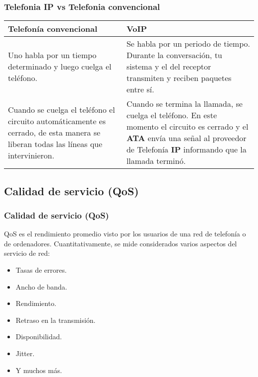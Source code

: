 \documentclass{beamer}
\begin{document}
\begin{frame}
\frametitle{Telefonia IP vs Telefonia convencional}
\begin{tabular}{|p{5.5cm}|p{5.5cm}|}
				\hline
		Telefonía convencional & VoIP \\
		\hline \hline
		Uno habla por un tiempo determinado y luego cuelga el teléfono. & Se habla por un periodo de tiempo. Durante la conversación, tu sistema y el del receptor transmiten y reciben paquetes entre sí. \\
		\hline
		Cuando se cuelga el teléfono el circuito automáticamente es cerrado, de esta manera se liberan todas las líneas que intervinieron. & Cuando se termina la llamada, se cuelga el teléfono. En este momento el circuito es cerrado y el \textbf{ATA} envía una señal al proveedor de Telefonía \textbf{IP} informando que la llamada terminó. \\
		\hline
\end{tabular}
\end{frame}
\subsection{Calidad de servicio (QoS)}
\begin{frame}
\frametitle{Calidad de servicio (QoS)}
		QoS es el rendimiento promedio visto por los usuarios de una red de telefonía o de ordenadores. Cuantitativamente, se mide considerados varios aspectos del servicio de red:
		\begin{itemize}
			\item Tasas de errores.
			\item Ancho de banda.
			\item Rendimiento.
			\item Retraso en la transmisión.
			\item Disponibilidad.
			\item Jitter.
			\item Y muchos más.
		\end{itemize}
\end{frame}
\end{document}
